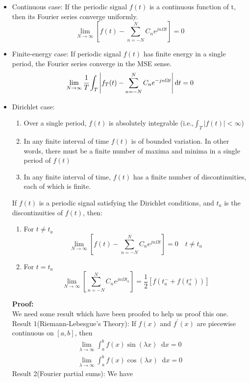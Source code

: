 \documentclass[margin,line]{res}
\newcommand*{\dif}{\mathop{}\!\mathrm{d}}
\begin{document}
\begin{resume}
\begin{itemize}
\item Continuous case: If the periodic signal $f(t)$ is a continuous function of t, then its Fourier series converge uniformly.
$$
\lim_{N \rightarrow \infty} \left[ f(t) - \sum\limits_{n=-N}^{N}{C_n e^{jn\Omega t}} \right] = 0
$$
\item Finite-energy case: If periodic signal $f(t)$ has finite energy in a single period, the Fourier series converge in the MSE sense.
$$
\lim_{N \rightarrow \infty} \cfrac{1}{T} \int_{T}\left| f_T(t) - \sum\limits_{n=-N}^{N}C_n e^{-jn\Omega t} \right| \dif t  = 0\nonumber
$$
\item Dirichlet case:
\begin{enumerate}
	\item Over a single period, $f(t)$ is absolutely integrable (i.e.,$\int_{T}\left| f(t) \right| < \infty$)
	\item In any finite interval of time $f(t)$ is of bounded variation. In other words, there must be a finite number of maxima and minima in a single period of $f(t)$
	\item In any finite interval of time, $f(t)$ has a finite number of discontinuities, each of which is finite.
\end{enumerate}
If $f(t)$ is a periodic signal satisfying the Dirichlet conditions, and $t_a$ is the discontinuities of $f(t)$, then:
\begin{enumerate}
	\item For $t \neq t_a$
	$$
	\lim_{N \rightarrow \infty} \left[ f(t) - \sum\limits_{n=-N}^{N} C_n e^{jn\Omega t} \right] = 0 \quad t \neq t_a
	$$
	\item For $t = t_a$
	$$
	\lim_{N \rightarrow \infty} \left[ \sum\limits_{n=-N}^{N} C_n e^{jn\Omega t_a}\right] =
	\frac{1}{2}\left[ f(t_a^{-} + f(t_a^{+})) \right]
	$$
\end{enumerate}
\textbf{Proof:} \\
We need some result which have been proofed to help us proof this one.\\
Result 1(Riemann-Lebesgue's Theory): If $f(x)$ and $f^{'}(x)$ are piecewise continuous on $\left[ a,b \right]$, then
\begin{align}
\lim_{\lambda \rightarrow \infty} \int_{a}^{b} f(x)\sin(\lambda x) \dif x = 0 \nonumber \\
\lim_{\lambda \rightarrow \infty} \int_{a}^{b} f(x)\cos(\lambda x) \dif x = 0 \nonumber
\end{align}
Result 2(Fourier partial sums): We have 

\end{itemize}
\end{resume}
\end{document}
